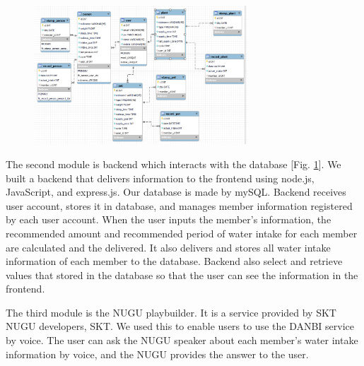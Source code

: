 \documentclass[conference]{IEEEtran}
\begin{document}
\par \begin{figure}[h!]
\includegraphics[width=8cm]{image/db.PNG}
\centering
\caption{}
\label{fig:db}
\end{figure}

The second module is backend which interacts with the database [Fig. \ref{fig:db}]. We built a backend that delivers information to the frontend using node.js, JavaScript, and express.js. Our database is made by mySQL. Backend receives user account, stores it in database, and manages member information registered by each user account. When the user inputs the member's information, the recommended amount and recommended period of water intake for each member are calculated and the delivered. It also delivers and stores all water intake information of each member to the database. Backend also select and retrieve values that stored in the database so that the user can see the information in the frontend.

The third module is the NUGU playbuilder. It is a service provided by SKT NUGU developers, SKT. We used this to enable users to use the DANBI service by voice. The user can ask the NUGU speaker about each member's water intake information by voice, and the NUGU provides the answer to the user.
\end{document}
